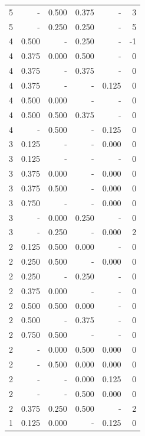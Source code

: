 \documentclass[a4paper]{article}\usepackage{graphicx, color}
\begin{document}
\begin{table}[ht]
\begin{tabular}{rrrrrr}
  5 & - & 0.500 & 0.375 & - & 3 \\ 
   \rowcolor{goodColor} 5 & - & 0.250 & 0.250 & - & 5 \\ 
   \rowcolor{sosoColor} 4 & 0.500 & - & 0.250 & - & -1 \\ 
   \rowcolor{badColor} 4 & 0.375 & 0.000 & 0.500 & - & 0 \\ 
   \rowcolor{sosoColor} 4 & 0.375 & - & 0.375 & - & 0 \\ 
   \rowcolor{nullColor} 4 & 0.375 & - & - & 0.125 & 0 \\ 
  4 & 0.500 & 0.000 & - & - & 0 \\ 
  4 & 0.500 & 0.500 & 0.375 & - & 0 \\ 
  4 & - & 0.500 & - & 0.125 & 0 \\ 
   \rowcolor{nullColor} 3 & 0.125 & - & - & 0.000 & 0 \\ 
   \rowcolor{nullColor} 3 & 0.125 & - & - & - & 0 \\ 
  3 & 0.375 & 0.000 & - & 0.000 & 0 \\ 
  3 & 0.375 & 0.500 & - & 0.000 & 0 \\ 
   \rowcolor{nullColor} 3 & 0.750 & - & - & 0.000 & 0 \\ 
   \rowcolor{badColor} 3 & - & 0.000 & 0.250 & - & 0 \\ 
  3 & - & 0.250 & - & 0.000 & 2 \\ 
   \rowcolor{badColor} 2 & 0.125 & 0.500 & 0.000 & - & 0 \\ 
  2 & 0.250 & 0.500 & - & 0.000 & 0 \\ 
   \rowcolor{sosoColor} 2 & 0.250 & - & 0.250 & - & 0 \\ 
  2 & 0.375 & 0.000 & - & - & 0 \\ 
   \rowcolor{badColor} 2 & 0.500 & 0.500 & 0.000 & - & 0 \\ 
   \rowcolor{sosoColor} 2 & 0.500 & - & 0.375 & - & 0 \\ 
  2 & 0.750 & 0.500 & - & - & 0 \\ 
   \rowcolor{badColor} 2 & - & 0.000 & 0.500 & 0.000 & 0 \\ 
   \rowcolor{badColor} 2 & - & 0.500 & 0.000 & 0.000 & 0 \\ 
   \rowcolor{sosoColor} 2 & - & - & 0.000 & 0.125 & 0 \\ 
   \rowcolor{sosoColor} 2 & - & - & 0.500 & 0.000 & 0 \\ 
   \rowcolor{badColor} 2 & 0.375 & 0.250 & 0.500 & - & 2 \\ 
  1 & 0.125 & 0.000 & - & 0.125 & 0 \\ 

\end{tabular}
\end{table}
\end{document}
